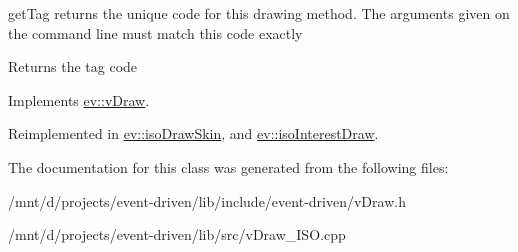 get\+Tag returns the unique code for this drawing method. The arguments given on the command line must match this code exactly 

\begin{DoxyReturn}{Returns}
the tag code 
\end{DoxyReturn}


Implements \hyperlink{classev_1_1vDraw_ac01381befeffef2b930cbceb28b18a28}{ev\+::v\+Draw}.



Reimplemented in \hyperlink{classev_1_1isoDrawSkin_a9f1bce77ba050a37dfe151e2246779bc}{ev\+::iso\+Draw\+Skin}, and \hyperlink{classev_1_1isoInterestDraw_a93b2142d5652f725e21d34fedde103df}{ev\+::iso\+Interest\+Draw}.



The documentation for this class was generated from the following files\+:\begin{DoxyCompactItemize}
\item 
/mnt/d/projects/event-\/driven/lib/include/event-\/driven/v\+Draw.\+h\item 
/mnt/d/projects/event-\/driven/lib/src/v\+Draw\+\_\+\+I\+S\+O.\+cpp\end{DoxyCompactItemize}
